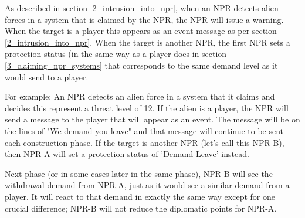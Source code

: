 \documentclass[10pt,a4paper,oneside]{article}
\begin{document}
As described in section \ref{2_intrusion_into_npr}, when an NPR detects alien forces in a system that is claimed by the NPR, the NPR will issue a warning. When the target is a player this appears as an event message as per section \ref{2_intrusion_into_npr}. When the target is another NPR, the first NPR sets a protection status (in the same way as a player does in section \ref{3_claiming_npr_systems} that corresponds to the same demand level as it would send to a player.

For example: An NPR detects an alien force in a system that it claims and decides this represent a threat level of 12. If the alien is a player, the NPR will send a message to the player that will appear as an event. The message will be on the lines of "We demand you leave" and that message will continue to be sent each construction phase. If the target is another NPR (let's call this NPR-B), then NPR-A will set a protection status of 'Demand Leave' instead.

Next phase (or in some cases later in the same phase), NPR-B will see the withdrawal demand from NPR-A, just as it would see a similar demand from a player. It will react to that demand in exactly the same way except for one crucial difference; NPR-B will not reduce the diplomatic points for NPR-A.
\end{document}
